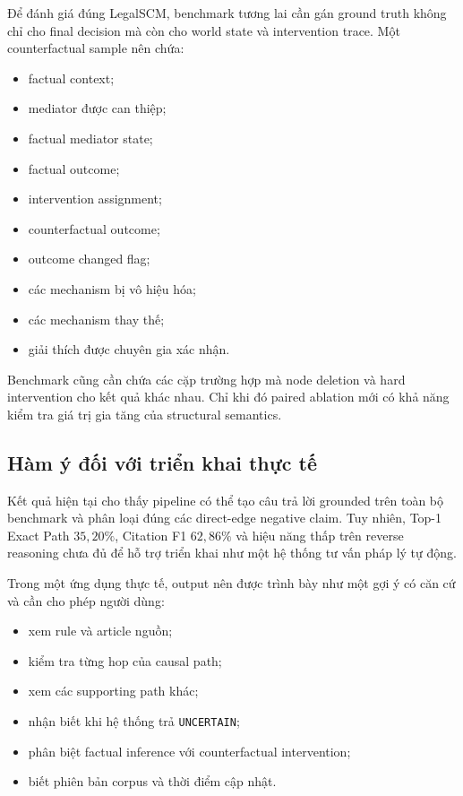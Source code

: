 Để đánh giá đúng LegalSCM, benchmark tương lai cần gán ground truth không chỉ
cho final decision mà còn cho world state và intervention trace. Một
counterfactual sample nên chứa:

\begin{itemize}
    \item factual context;
    \item mediator được can thiệp;
    \item factual mediator state;
    \item factual outcome;
    \item intervention assignment;
    \item counterfactual outcome;
    \item outcome changed flag;
    \item các mechanism bị vô hiệu hóa;
    \item các mechanism thay thế;
    \item giải thích được chuyên gia xác nhận.
\end{itemize}

Benchmark cũng cần chứa các cặp trường hợp mà node deletion và hard
intervention cho kết quả khác nhau. Chỉ khi đó paired ablation mới có khả
năng kiểm tra giá trị gia tăng của structural semantics.

\subsection{Hàm ý đối với triển khai thực tế}

Kết quả hiện tại cho thấy pipeline có thể tạo câu trả lời grounded trên toàn
bộ benchmark và phân loại đúng các direct-edge negative claim. Tuy nhiên,
Top-1 Exact Path \(35{,}20\%\), Citation F1 \(62{,}86\%\) và hiệu năng thấp
trên reverse reasoning chưa đủ để hỗ trợ triển khai như một hệ thống tư vấn
pháp lý tự động.

Trong một ứng dụng thực tế, output nên được trình bày như một gợi ý có căn
cứ và cần cho phép người dùng:

\begin{itemize}
    \item xem rule và article nguồn;
    \item kiểm tra từng hop của causal path;
    \item xem các supporting path khác;
    \item nhận biết khi hệ thống trả \texttt{UNCERTAIN};
    \item phân biệt factual inference với counterfactual intervention;
    \item biết phiên bản corpus và thời điểm cập nhật.
\end{itemize}

